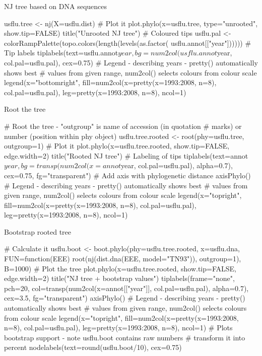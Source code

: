\documentclass[compress, ucs, xelatex, 11pt, xcolor=svgnames,
  hyperref={
    bookmarks=true,
    unicode=true,
    colorlinks=true,
    pdftitle={Molecular data in R},
    plainpages=false,
    pdfauthor={Vojtech Zeisek},
    pdfsubject={Course about phylogeny and evolution in R},
    pdfcreator={XeLaTeX},
    pdfkeywords={R, evolution, phylogeny, molecular data},
    linkcolor=Tomato,
    anchorcolor=SaddleBrown,
    citecolor=Goldenrod,
    filecolor=DarkMagenta,
    menucolor=Sienna,
    urlcolor=DarkTurquoise,
    pdftex},
  url={hyphens, lowtilde} %
  ]{beamer}
\begin{document}
\begin{frame}[fragile]{NJ tree based on DNA sequences}
  \begin{spluscode}
    usflu.tree <- nj(X=usflu.dist)
    # Plot it
    plot.phylo(x=usflu.tree, type="unrooted", show.tip=FALSE)
    title("Unrooted NJ tree")
    # Coloured tips
    usflu.pal <- colorRampPalette(topo.colors(length(levels(as.factor(
      usflu.annot[["year"])))))
    # Tip labels
    tiplabels(text=usflu.annot$year, bg=num2col(usflu.annot$year,
      col.pal=usflu.pal), cex=0.75)
    # Legend - describing years - pretty() automatically shows best
    # values from given range, num2col() selects colours from colour scale
    legend(x="bottomright", fill=num2col(x=pretty(x=1993:2008, n=8),
      col.pal=usflu.pal), leg=pretty(x=1993:2008, n=8), ncol=1)
  \end{spluscode}
\end{frame}

\begin{frame}[fragile]{Root the tree}
  \begin{spluscode}
    # Root the tree - "outgroup" is name of accession (in quotation
    # marks) or number (position within phy object)
    usflu.tree.rooted <- root(phy=usflu.tree, outgroup=1)
    # Plot it
    plot.phylo(x=usflu.tree.rooted, show.tip=FALSE, edge.width=2)
    title("Rooted NJ tree")
    # Labeling of tips
    tiplabels(text=annot$year, bg=transp(num2col(x=annot$year,
      col.pal=usflu.pal), alpha=0.7), cex=0.75, fg="transparent")
    # Add axis with phylogenetic distance
    axisPhylo()
    # Legend - describing years - pretty() automatically shows best
    # values from given range, num2col() selects colours from colour scale
    legend(x="topright", fill=num2col(x=pretty(x=1993:2008, n=8),
      col.pal=usflu.pal), leg=pretty(x=1993:2008, n=8), ncol=1)
  \end{spluscode}
\end{frame}

\begin{frame}[fragile]{Bootstrap rooted tree}
  \begin{spluscode}
    # Calculate it
    usflu.boot <- boot.phylo(phy=usflu.tree.rooted, x=usflu.dna,
      FUN=function(EEE) root(nj(dist.dna(EEE, model="TN93")),
      outgroup=1), B=1000)
    # Plot the tree
    plot.phylo(x=usflu.tree.rooted, show.tip=FALSE, edge.width=2)
    title("NJ tree + bootstrap values")
    tiplabels(frame="none", pch=20, col=transp(num2col(x=annot[["year"]],
      col.pal=usflu.pal), alpha=0.7), cex=3.5, fg="transparent")
    axisPhylo()
    # Legend - describing years - pretty() automatically shows best
    # values from given range, num2col() selects colours from colour scale
    legend(x="topright", fill=num2col(x=pretty(x=1993:2008, n=8),
      col.pal=usflu.pal), leg=pretty(x=1993:2008, n=8), ncol=1)
    # Plots bootstrap support - note usflu.boot contains raw numbers
    # transform it into percent
    nodelabels(text=round(usflu.boot/10), cex=0.75)
  \end{spluscode}
\end{frame}
\end{document}
